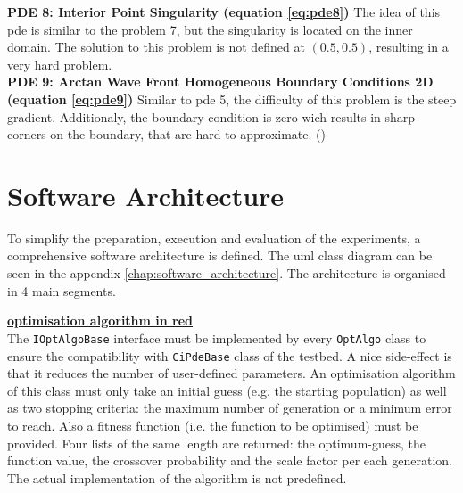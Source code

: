 \documentclass[./\jobname.tex]{subfiles}
\begin{document}
\textbf{PDE 8: Interior Point Singularity (equation \ref{eq:pde8})} The idea of this \gls{pde} is similar to the problem 7, but the singularity is located on the inner domain. The solution to this problem is not defined at $(0.5, 0.5)$, resulting in a very hard problem. \\

\textbf{PDE 9: Arctan Wave Front Homogeneous Boundary Conditions 2D (equation \ref{eq:pde9})} Similar to \gls{pde} 5, the difficulty of this problem is the steep gradient. Additionaly, the boundary condition is zero wich results in sharp corners on the boundary, that are hard to approximate. (\cite{mitchell_nist_2018})\\


\section{Software Architecture}



To simplify the preparation, execution and evaluation of the experiments, a comprehensive software architecture is defined. The \gls{uml} class diagram can be seen in the appendix \ref{chap:software_architecture}. The architecture is organised in 4 main segments. 

\textcolor{opt_algo_colour}{\large \underline{\textbf{optimisation algorithm in red}}} \\
The \colorbox{light-gray}{\lstinline[basicstyle=\ttfamily\color{black}]|IOptAlgoBase|} interface must be implemented by every \colorbox{light-gray}{\lstinline[basicstyle=\ttfamily\color{black}]|OptAlgo|} class to ensure the compatibility with \colorbox{light-gray}{\lstinline[basicstyle=\ttfamily\color{black}]|CiPdeBase|} class of the testbed. A nice side-effect is that it reduces the number of user-defined parameters. An optimisation algorithm of this class must only take an initial guess (e.g. the starting population) as well as two stopping criteria: the maximum number of generation or a minimum error to reach. Also a fitness function (i.e. the function to be optimised) must be provided. Four lists of the same length are returned: the optimum-guess, the function value, the crossover probability and the scale factor per each generation. The actual implementation of the algorithm is not predefined. 
\end{document}
